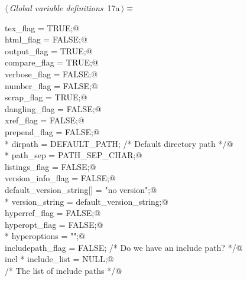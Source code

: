 \documentclass[a4paper]{report}
\begin{document}
\begin{flushleft} \small
\begin{minipage}{\linewidth}\label{scrap18}\raggedright\small
{} $\langle\,${\it Global variable definitions}\nobreak\ {\footnotesize {17a}}$\,\rangle\equiv$
\vspace{-1ex}
\begin{list}{}{} \item
\mbox{}\verb@int tex_flag = TRUE;@\\
\mbox{}\verb@int html_flag = FALSE;@\\
\mbox{}\verb@int output_flag = TRUE;@\\
\mbox{}\verb@int compare_flag = TRUE;@\\
\mbox{}\verb@int verbose_flag = FALSE;@\\
\mbox{}\verb@int number_flag = FALSE;@\\
\mbox{}\verb@int scrap_flag = TRUE;@\\
\mbox{}\verb@int dangling_flag = FALSE;@\\
\mbox{}\verb@int xref_flag = FALSE;@\\
\mbox{}\verb@int prepend_flag = FALSE;@\\
\mbox{}\verb@char * dirpath = DEFAULT_PATH; /* Default directory path */@\\
\mbox{}\verb@char * path_sep = PATH_SEP_CHAR;@\\
\mbox{}\verb@int listings_flag = FALSE;@\\
\mbox{}\verb@int version_info_flag = FALSE;@\\
\mbox{}\verb@char default_version_string[] = "no version";@\\
\mbox{}\verb@char *  version_string = default_version_string;@\\
\mbox{}\verb@int hyperref_flag = FALSE;@\\
\mbox{}\verb@int hyperopt_flag = FALSE;@\\
\mbox{}\verb@char * hyperoptions = "";@\\
\mbox{}\verb@int includepath_flag = FALSE; /* Do we have an include path? */@\\
\mbox{}\verb@struct incl * include_list = NULL;@\\
\mbox{}\verb@                       /* The list of include paths */@\\
\mbox{}\verb@@{\NWsep}
\end{list}
\vspace{-1.5ex}
\footnotesize
\begin{list}{}{\setlength{\itemsep}{-\parsep}\setlength{\itemindent}{-\leftmargin}}

\end{list}
\end{minipage}
\end{flushleft}
\end{document}
